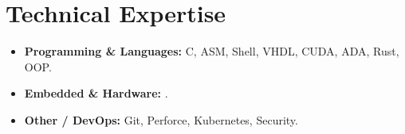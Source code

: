 \documentclass[9pt,a4paper]{article}
\begin{document}
\section*{Technical Expertise}
\begin{tcolorbox}[mybox]
\begin{itemize}
\item \textbf{Programming \& Languages:} C, ASM, Shell, VHDL, CUDA, ADA, Rust, OOP.

\item \textbf{Embedded \& Hardware:} .

\item \textbf{Other / DevOps:} Git, Perforce, Kubernetes, Security.
\end{itemize}
\end{tcolorbox}
\end{document}
